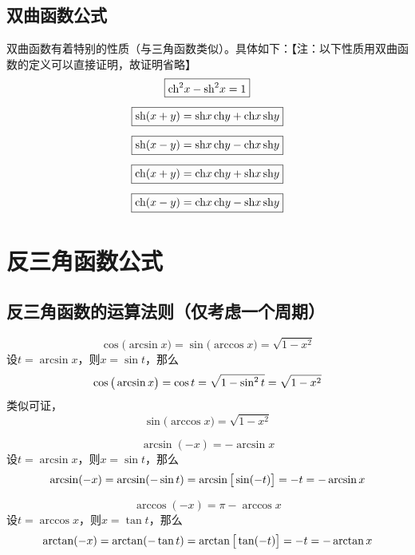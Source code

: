 \subsection{双曲函数公式}
双曲函数有着特别的性质（与三角函数类似）。具体如下：【注：以下性质用双曲函数的定义可以直接证明，故证明省略】
\begin{align}
	\boxed{\text{ch}^2 x - \text{sh}^2 x = 1} \qquad \quad\\[0.5em]
	\boxed{\text{sh} (x + y) = \text{sh} x \,\text{ch} y + \text{ch} x \,\text{sh} y} \\[0.5em]
	\boxed{\text{sh} (x - y) = \text{sh} x \,\text{ch} y - \text{ch} x \,\text{sh} y} \\[0.5em]
	\boxed{\text{ch} (x + y) = \text{ch} x \,\text{ch} y + \text{sh} x \,\text{sh} y} \\[0.5em]
	\boxed{\text{ch} (x - y) = \text{ch} x \,\text{ch} y - \text{sh} x \,\text{sh} y}  
\end{align}

\section{反三角函数公式}
\subsection{反三角函数的运算法则（仅考虑一个周期）}
\vspace*{-1em}
\begin{equation}
	\boxed{\cos \big( \arcsin x \big) = \sin \big( \arccos x \big) = \sqrt{1 - x^2}}
\end{equation}
\proof 设$t = \arcsin x$，则$x = \sin t$，那么\\[-2.2em]
$$
\cos \big(\arcsin x \big) = \cos t = \sqrt{1 - \sin^2 t} = \sqrt{1 - x^2}
\vspace*{-0.5em}
$$
类似可证，
$$
\sin \big( \arccos x \big) = \sqrt{1 - x^2}
$$

\begin{equation}
	\boxed{\arcsin (-x) = - \arcsin x}
\end{equation}
\proof 设$t = \arcsin x$，则$x = \sin t$，那么\\[-2.2em]
$$
\arcsin(-x) = \arcsin(- \sin t) = \arcsin \big[ \sin (-t) \big] = -t = - \arcsin x
\vspace*{-0.5em}
$$

\begin{equation}
	\boxed{\arccos(-x) = \pi - \arccos x}
\end{equation}
\proof 设$t = \arccos x$，则$x = \tan t$，那么\\[-2.2em]
$$
\arctan (-x) = \arctan(- \tan t) = \arctan \big[ \tan (-t) \big] = - t = - \arctan x
\vspace*{-0.5em}
$$

